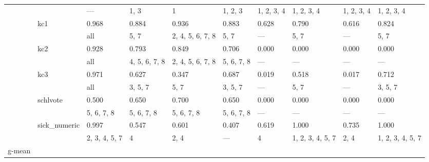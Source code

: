 \documentclass{article}
\begin{document}
\begin{center}
\begin{longtable}{p{1.2cm}p{1.8cm}p{1cm}p{1cm}p{1cm}p{1cm}p{1cm}p{1cm}p{1cm}p{1cm}}
             &              & ---           & 1, 3             & 1                & 1, 2, 3          & 1, 2, 3, 4       & 1, 2, 3, 4       & 1, 2, 3, 4       & 1, 2, 3, 4       \\
             & kc1          & 0.968         & 0.884            & 0.936            & 0.883            & 0.628            & 0.790            & 0.616            & 0.824            \\
             &              & all           & 5, 7             & 2, 4, 5, 6, 7, 8 & 5, 7             & ---              & 5, 7             & ---              & 5, 7             \\
             & kc2          & 0.928         & 0.793            & 0.849            & 0.706            & 0.000            & 0.000            & 0.000            & 0.000            \\
             &              & all           & 4, 5, 6, 7, 8    & 2, 4, 5, 6, 7, 8 & 5, 6, 7, 8       & ---              & ---              & ---              & ---              \\
             & kc3          & 0.971         & 0.627            & 0.347            & 0.687            & 0.019            & 0.518            & 0.017            & 0.712            \\
             &              & all           & 3, 5, 7          & 5, 7             & 3, 5, 7          & ---              & 5, 7             & ---              & 3, 5, 7          \\
             & schlvote     & 0.500         & 0.650            & 0.700            & 0.650            & 0.000            & 0.000            & 0.000            & 0.000            \\
             &              & 5, 6, 7, 8    & 5, 6, 7, 8       & 5, 6, 7, 8       & 5, 6, 7, 8       & ---              & ---              & ---              & ---              \\
             & sick\_numeric & 0.997         & 0.547            & 0.601            & 0.407            & 0.619            & 1.000            & 0.735            & 1.000            \\
             &              & 2, 3, 4, 5, 7 & 4                & 2, 4             & ---              & 4                & 1, 2, 3, 4, 5, 7 & 2, 4             & 1, 2, 3, 4, 5, 7 \\
 g-mean      &              &               &                  &                  &                  &                  &                  &                  &                  \\

\end{longtable}
\end{center}
\end{document}

